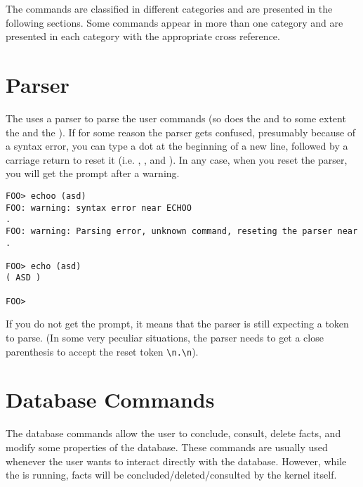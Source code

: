The \CPK{} commands are classified in different categories and are presented
in the following sections. Some commands appear in more than
one category and are presented in each category with the appropriate cross
reference.



\section{\CPK{} Parser}

The \CPK{} uses a parser to parse the user commands (so does the \OPRSS{}
and to some extent the \OPE{} and the \XPK{}). If for some reason the parser
gets confused, presumably because of a syntax error, you can type a dot at the
beginning of a new line, followed by a carriage return to reset it (i.e.
, , and ). In any case, when you reset the parser, you
will get the prompt after a warning.

\begin{verbatim}
FOO> echoo (asd)
FOO: warning: syntax error near ECHOO
.
FOO: warning: Parsing error, unknown command, reseting the parser near .

FOO> echo (asd)
( ASD )

FOO>
\end{verbatim}

If you do not get the prompt, it means that the parser is still expecting a
token to parse. (In some very peculiar situations, the parser needs to get a close
parenthesis \samp{)} to accept the reset token \verb+\n.\n+).


\section{\CPK{} Database Commands}

The database commands allow the user to conclude, consult, delete facts, and
modify some properties of the database. These commands are usually used
whenever the user wants to interact directly with the database. However, while
the \CPK{} is running, facts will be concluded/deleted/consulted by the kernel
itself.

